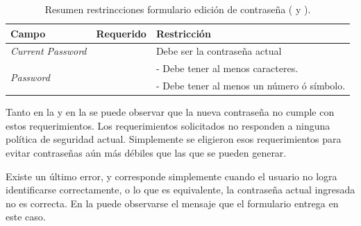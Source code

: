\begin{table}[H]
    \centering
	\begin{tabular}{ |l|c||l| }
		\hline Campo & Requerido & Restricción \\ \hline
		\multirow{1}{*}{\textit{Current Password}} 	&  \checkmark 					&  Debe ser la contraseña actual\\ \hline
		\multirow{2}{*}{\textit{Password}} 			&  \multirow{2}{*}{\checkmark}	&  - Debe tener al menos  caracteres.\\
													&  								&  - Debe tener al menos un número ó símbolo.\\ \hline
	\end{tabular}
 	\caption{Resumen restrincciones formulario edición de contraseña (  y ).}
    \label{tab:profile:form:restrictions:update_password}
\end{table}


Tanto en la  y en la  se puede observar que la nueva contraseña no cumple con estos requerimientos.
Los requerimientos solicitados no responden a ninguna política de seguridad actual. Simplemente se eligieron esos requerimientos para evitar contraseñas aún más débiles que las que se pueden generar.


Existe un último error, y corresponde simplemente cuando el usuario no logra identificarse correctamente, o lo que es equivalente, la contraseña actual ingresada no es correcta. En la  puede observarse el mensaje que el formulario entrega en este caso.








